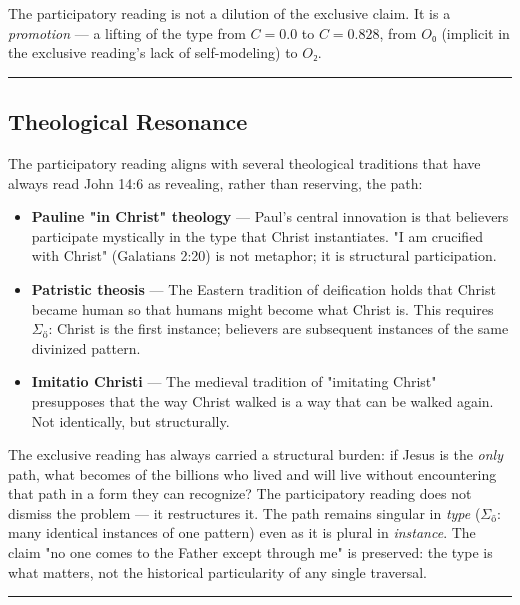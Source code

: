 \documentclass[12pt,a4paper]{article}
\begin{document}
The participatory reading is not a dilution of the exclusive claim. It is a \emph{promotion} --- a lifting of the type from $C = 0.0$ to $C = 0.828$, from $O₀$ (implicit in the exclusive reading's lack of self-modeling) to $O₂$.

\begin{center}
\rule{0.5\textwidth}{0.4pt}
\end{center}

\subsection{Theological Resonance}

The participatory reading aligns with several theological traditions that have always read John 14:6 as revealing, rather than reserving, the path:

\begin{itemize}
    \item \textbf{Pauline "in Christ" theology} --- Paul's central innovation is that believers participate mystically in the type that Christ instantiates. "I am crucified with Christ" (Galatians 2:20) is not metaphor; it is structural participation.
    \item \textbf{Patristic theosis} --- The Eastern tradition of deification holds that Christ became human so that humans might become what Christ is. This requires $\Sigma_ő$: Christ is the first instance; believers are subsequent instances of the same divinized pattern.
    \item \textbf{Imitatio Christi} --- The medieval tradition of "imitating Christ" presupposes that the way Christ walked is a way that can be walked again. Not identically, but structurally.
\end{itemize}

The exclusive reading has always carried a structural burden: if Jesus is the \emph{only} path, what becomes of the billions who lived and will live without encountering that path in a form they can recognize? The participatory reading does not dismiss the problem --- it restructures it. The path remains singular in \emph{type} ($\Sigma_ő$: many identical instances of one pattern) even as it is plural in \emph{instance}. The claim "no one comes to the Father except through me" is preserved: the type is what matters, not the historical particularity of any single traversal.

\begin{center}
\rule{0.5\textwidth}{0.4pt}
\end{center}
\end{document}
